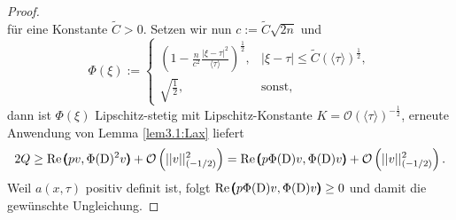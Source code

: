 \begin{proof}
\begin{equation}
\end{equation}
für eine Konstante $\tilde{C}>0$. Setzen wir nun $c:=\tilde{C}\sqrt{2n}$ und 
\begin{equation}
	\Phi(\xi):=\begin{cases}
		\left(1-\frac{n}{c^2}\frac{| \xi-\tau|^2}{\langle\tau\rangle}\right)^{\frac{1}{2}}, &| \xi-\tau| \le \tilde C(\langle\tau\rangle)^{\frac{1}{2}},\\
		\sqrt{\frac{1}{2}}, & \text{sonst},
	\end{cases}
\end{equation}
dann ist $\Phi(\xi)$ Lipschitz-stetig mit Lipschitz-Konstante $K=\mathcal O(\langle\tau\rangle)^{-\frac{1}{2}}$, erneute Anwendung von Lemma \ref{lem3.1:Lax} liefert
\begin{equation}
	2Q \ge \operatorname{Re}\pmb(pv,\Phi(\mathrm D)^2v\pmb)+\mathcal{O}\left(|| v||_{\left(-{1}/{2}\right)}^2\right) = \operatorname{Re}\pmb(p\Phi(\mathrm D)v,\Phi(\mathrm D)v\pmb)+\mathcal{O}\left(|| v||_{\left(-{1}/{2}\right)}^2\right).
\end{equation}
Weil $a(x,\tau)$ positiv definit ist, folgt $\operatorname{Re}\pmb(p\Phi(\mathrm D)v,\Phi(\mathrm D)v\pmb)\ge 0$ und damit die gewünschte Ungleichung. 
\end{proof}

